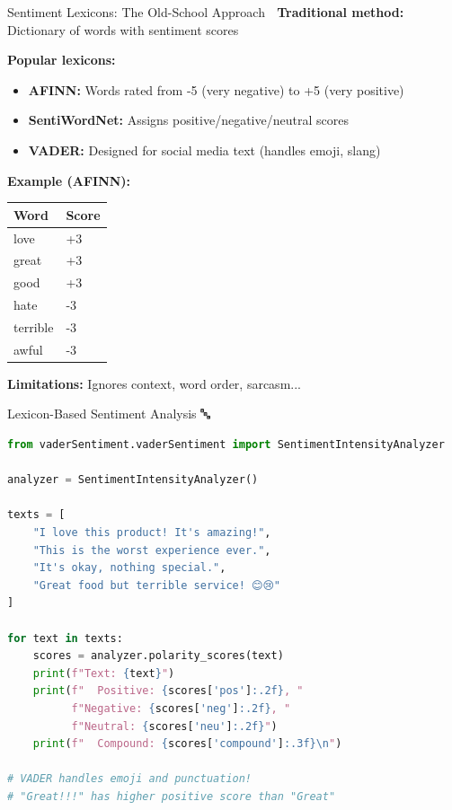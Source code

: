 \documentclass[aspectratio=169]{beamer}
\begin{document}
\begin{frame}{Sentiment Lexicons: The Old-School Approach 📖}
    \textbf{Traditional method:} Dictionary of words with sentiment scores

    \vspace{0.5em}
    \textbf{Popular lexicons:}
    \begin{itemize}\setlength{\itemsep}{0pt}
        \item \textbf{AFINN:} Words rated from -5 (very negative) to +5 (very positive)
        \item \textbf{SentiWordNet:} Assigns positive/negative/neutral scores
        \item \textbf{VADER:} Designed for social media text (handles emoji, slang)
    \end{itemize}

    \vspace{0.5em}
    \textbf{Example (AFINN):}
    \begin{center}
        \begin{tabular}{ll}
            \toprule
            \textbf{Word} & \textbf{Score} \\
            \midrule
            love & +3 \\
            great & +3 \\
            good & +3 \\
            hate & -3 \\
            terrible & -3 \\
            awful & -3 \\
            \bottomrule
        \end{tabular}
    \end{center}

    \vspace{0.3em}
    \textbf{Limitations:} Ignores context, word order, sarcasm...
\end{frame}

\begin{frame}[fragile]{Lexicon-Based Sentiment Analysis 🔤}
    \begin{lstlisting}[language=Python]
from vaderSentiment.vaderSentiment import SentimentIntensityAnalyzer

analyzer = SentimentIntensityAnalyzer()

texts = [
    "I love this product! It's amazing!",
    "This is the worst experience ever.",
    "It's okay, nothing special.",
    "Great food but terrible service! 😊😢"
]

for text in texts:
    scores = analyzer.polarity_scores(text)
    print(f"Text: {text}")
    print(f"  Positive: {scores['pos']:.2f}, "
          f"Negative: {scores['neg']:.2f}, "
          f"Neutral: {scores['neu']:.2f}")
    print(f"  Compound: {scores['compound']:.3f}\n")

# VADER handles emoji and punctuation!
# "Great!!!" has higher positive score than "Great"
    \end{lstlisting}
\end{frame}
\end{document}
